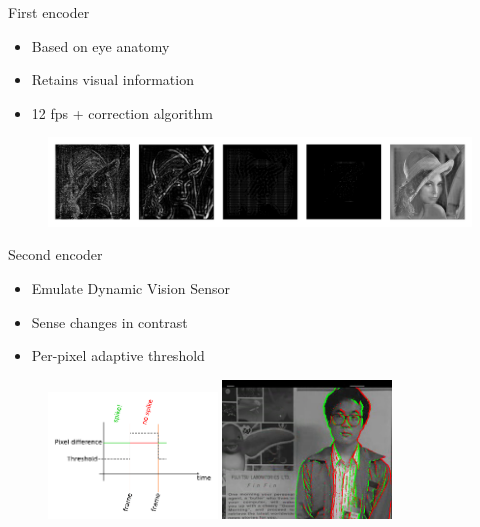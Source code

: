 \documentclass[17pt,mathserif]{beamer}
\begin{document}
    \begin{frame}{First encoder}
      \vspace*{-3em}
      \begin{itemize}
        \item Based on eye anatomy\cite{basab}
        \item Retains visual information
        \item 12 fps + correction algorithm
      \end{itemize}
      \vspace*{-1em}
      \begin{figure}
        \includegraphics[width=\textwidth]{focal-imgs}
      \end{figure}
    \end{frame}

    \begin{frame}{Second encoder}
      \vspace*{-2em}
      \begin{itemize}
        \item Emulate Dynamic Vision Sensor 
        \item Sense changes in contrast
        \item Per-pixel adaptive threshold
      \end{itemize}
      \vspace*{-1em}
      \begin{figure}
        \includegraphics[width=0.4\textwidth]{DVSemu} 
        \hspace*{0.1em}
        \includegraphics[width=0.4\textwidth]{dvs-emu-img}
      \end{figure}
    \end{frame}
\end{document}
